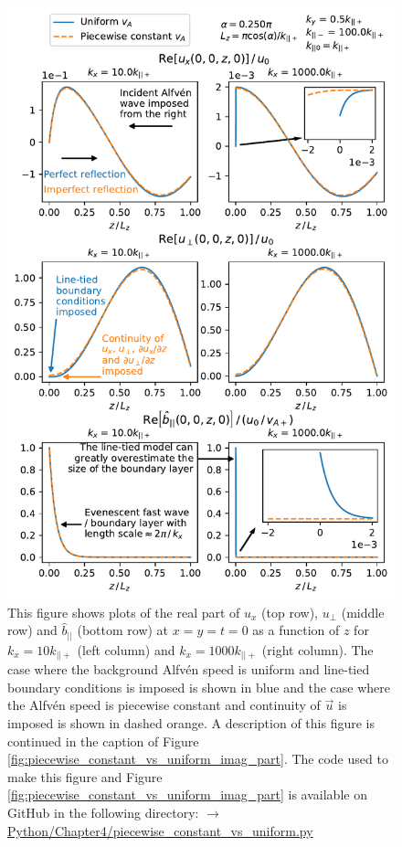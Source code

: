 \begin{figure}
    \centering
    \vspace{-20pt}
    \includegraphics[width=\textwidth,height=0.9\textheight,keepaspectratio]{figures/chapter04/piecewise_constant_vs_uniform_real_part.pdf}
    \vspace{-10pt}
    \caption{This figure shows plots of the real part of $u_x$ (top row), $u_\perp$ (middle row) and $\hat{b}_{||}$ (bottom row) at $x=y=t=0$ as a function of $z$ for $k_x=10k_{||+}$ (left column) and $k_x = 1000k_{||+}$ (right column). The case where the background Alfv\'en speed is uniform and line-tied boundary conditions is imposed is shown in blue and the case where the Alfv\'en speed is piecewise constant and continuity of $\vec{u}$ is imposed is shown in dashed orange. A description of this figure is continued in the caption of Figure \ref{fig:piecewise_constant_vs_uniform_imag_part}. The code used to make this figure and Figure \ref{fig:piecewise_constant_vs_uniform_imag_part} is available on GitHub in the following directory:\newline
    \href{https://github.com/aleksyprok/apkp_thesis/blob/main/Python/Chapter4/piecewise_constant_vs_uniform.py}{$\rightarrow$ Python/Chapter4/piecewise\_constant\_vs\_uniform.py}}
    \label{fig:piecewise_constant_vs_uniform_real_part}
    \vspace{-20pt}
\end{figure}

